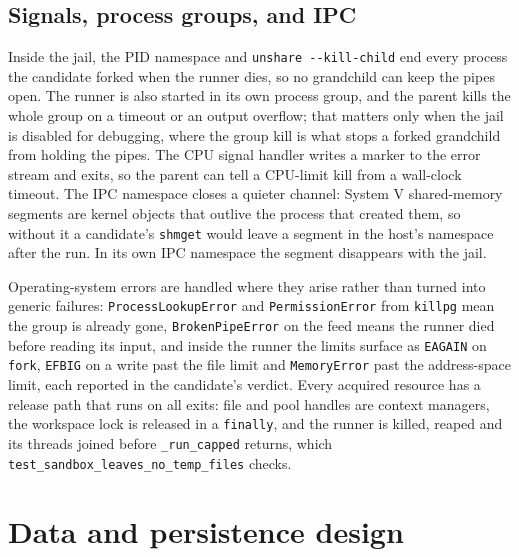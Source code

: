 \subsection{Signals, process groups, and IPC}

Inside the jail, the PID namespace and \texttt{unshare -{}-kill-child} end every
process the candidate forked when the runner dies, so no grandchild can keep the
pipes open. The runner is also started in its own process group, and the parent
kills the whole group on a timeout or an output overflow; that matters only
when the jail is disabled for debugging, where the group kill is what stops a
forked grandchild from holding the pipes. The CPU signal handler writes a marker to the error
stream and exits, so the parent can tell a CPU-limit kill from a wall-clock
timeout. The IPC namespace closes a quieter channel: System V shared-memory segments
are kernel objects that outlive the process that created them, so without it a
candidate's \texttt{shmget} would leave a segment in the host's namespace after
the run. In its own IPC namespace the segment disappears with the jail.

Operating-system errors are handled where they arise rather than turned into
generic failures: \texttt{ProcessLookupError} and \texttt{PermissionError} from
\texttt{killpg} mean the group is already gone, \texttt{BrokenPipeError} on the
feed means the runner died before reading its input, and inside the runner the
limits surface as \texttt{EAGAIN} on \texttt{fork}, \texttt{EFBIG} on a write
past the file limit and \texttt{MemoryError} past the address-space limit, each
reported in the candidate's verdict. Every acquired resource has a release path
that runs on all exits: file and pool handles are context managers, the
workspace lock is released in a \texttt{finally}, and the runner is killed,
reaped and its threads joined before \texttt{\_run\_capped} returns, which
\texttt{test\_sandbox\_leaves\_no\_temp\_files} checks.

\section{Data and persistence design}
\label{sec:design-persistence}

